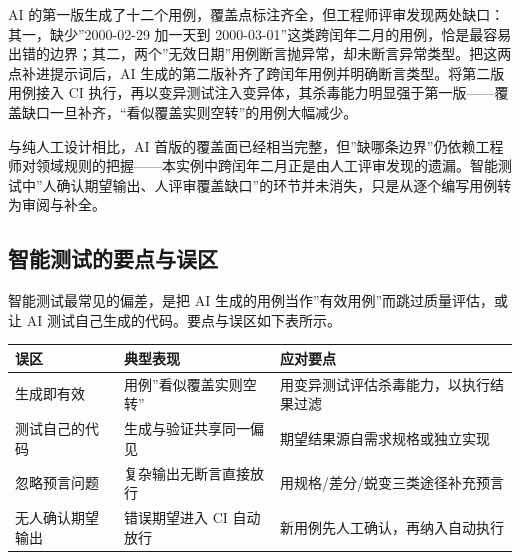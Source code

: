 \documentclass[12pt,a4paper,twoside,openany]{ctexbook}
\numberwithin{figure}{chapter}
\numberwithin{table}{chapter}
\newcounter{none}
\begin{document}
AI
的第一版生成了十二个用例，覆盖点标注齐全，但工程师评审发现两处缺口：其一，缺少''2000-02-29
加一天到
2000-03-01''这类跨闰年二月的用例，恰是最容易出错的边界；其二，两个''无效日期''用例断言抛异常，却未断言异常类型。把这两点补进提示词后，AI
生成的第二版补齐了跨闰年用例并明确断言类型。将第二版用例接入 CI
执行，再以变异测试注入变异体，其杀毒能力明显强于第一版------覆盖缺口一旦补齐，``看似覆盖实则空转''的用例大幅减少。

与纯人工设计相比，AI
首版的覆盖面已经相当完整，但''缺哪条边界''仍依赖工程师对领域规则的把握------本实例中跨闰年二月正是由人工评审发现的遗漏。智能测试中''人确认期望输出、人评审覆盖缺口''的环节并未消失，只是从逐个编写用例转为审阅与补全。

\subsection{智能测试的要点与误区}\label{ux667aux80fdux6d4bux8bd5ux7684ux8981ux70b9ux4e0eux8befux533a}

智能测试最常见的偏差，是把 AI
生成的用例当作''有效用例''而跳过质量评估，或让 AI
测试自己生成的代码。要点与误区如下表所示。

{\def\LTcaptype{none} %
\begin{longtable}[]{@{}
  >{\raggedright\arraybackslash}p{}
  >{\raggedright\arraybackslash}p{}
  >{\raggedright\arraybackslash}p{}@{}}
\toprule\noalign{}
\begin{minipage}[b]{\linewidth}\raggedright
误区
\end{minipage} & \begin{minipage}[b]{\linewidth}\raggedright
典型表现
\end{minipage} & \begin{minipage}[b]{\linewidth}\raggedright
应对要点
\end{minipage} \\
\midrule\noalign{}
\endhead
\bottomrule\noalign{}
\endlastfoot
生成即有效 & 用例''看似覆盖实则空转'' &
用变异测试评估杀毒能力，以执行结果过滤 \\
测试自己的代码 & 生成与验证共享同一偏见 &
期望结果源自需求规格或独立实现 \\
忽略预言问题 & 复杂输出无断言直接放行 &
用规格/差分/蜕变三类途径补充预言 \\
无人确认期望输出 & 错误期望进入 CI 自动放行 &
新用例先人工确认，再纳入自动执行 \\
\end{longtable}
}
\end{document}
